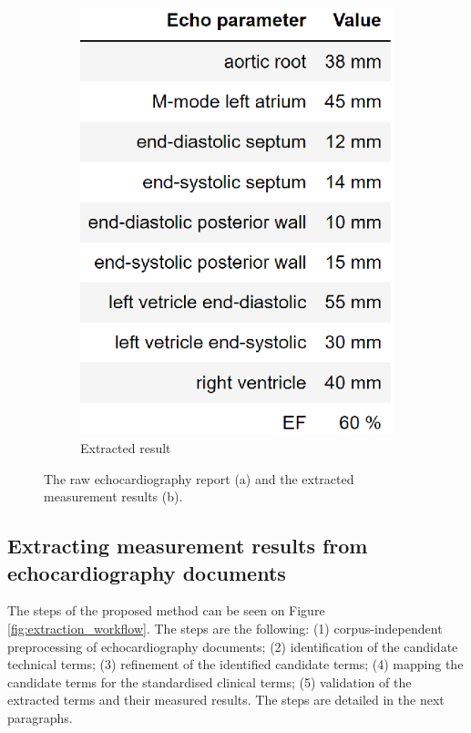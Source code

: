 \begin{figure}[h]
\begin{subfigure}[b]{0.36\textwidth}
		\includegraphics[width=\textwidth]{assets/figures/text_mining/corpus/extracted_echo_example.eps}
		\caption{Extracted result}
		\label{fig:extraction_example_b}
	\end{subfigure}
	\caption{The raw echocardiography report (a) and the extracted measurement results (b).}
	\label{fig:extraction_example}
\end{figure}

\subsection{Extracting measurement results from echocardiography documents}
\label{subsec:extracting}


The steps of the proposed method can be seen on Figure \ref{fig:extraction_workflow}. The steps are the following: (1) corpus-independent preprocessing of echocardiography documents; (2) identification of the candidate technical terms; (3) refinement of the identified candidate terms; (4) mapping the candidate terms for the standardised clinical terms; (5) validation of the extracted terms and their measured results. The steps are detailed in the next paragraphs.

